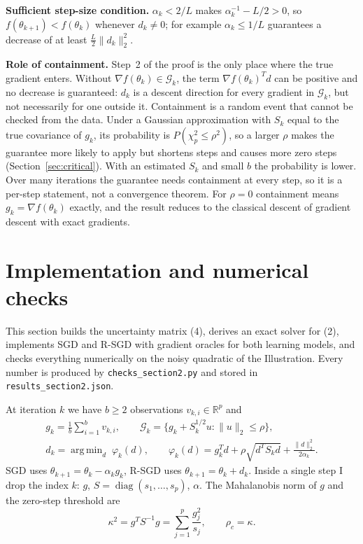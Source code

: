 \documentclass[11pt,a4paper]{article}
\newcommand{\G}{\mathcal{G}_k}
\newcommand{\norm}[1]{\lVert #1\rVert_2}
\DeclareMathOperator*{\argmin}{arg\,min}
\DeclareMathOperator{\diag}{diag}
\begin{document}
\textbf{Sufficient step-size condition.} $\alpha_k<2/L$ makes $\alpha_k^{-1}-L/2>0$, so
$f(\theta_{k+1})<f(\theta_k)$ whenever $d_k\ne0$; for example $\alpha_k\le1/L$ guarantees a decrease of
at least $\tfrac L2\norm{d_k}^2$.

\textbf{Role of containment.} Step~2 of the proof is the only place where the true gradient enters. Without
$\nabla f(\theta_k)\in\G$, the term $\nabla f(\theta_k)^Td$ can be positive and no decrease is
guaranteed: $d_k$ is a descent direction for every gradient in $\G$, but not necessarily for one
outside it. Containment is a random event that cannot be checked from the data. Under a Gaussian
approximation with $S_k$ equal to the true covariance of $g_k$, its probability is
$P(\chi^2_p\le\rho^2)$, so a larger $\rho$ makes the guarantee more likely to apply but shortens
steps and causes more zero steps (Section~\ref{sec:critical}). With an estimated $S_k$ and small
$b$ the probability is lower. Over many iterations the guarantee needs containment at every step,
so it is a per-step statement, not a convergence theorem. For $\rho=0$ containment means
$g_k=\nabla f(\theta_k)$ exactly, and the result reduces to the classical descent of gradient
descent with exact gradients.


\section{Implementation and numerical checks}\label{sec:impl}

This section builds the uncertainty matrix (4), derives an exact solver for (2), implements SGD and
R-SGD with gradient oracles for both learning models, and checks everything numerically on the noisy
quadratic of the Illustration. Every number is produced by \texttt{checks\_section2.py} and stored
in \texttt{results\_section2.json}.


At iteration $k$ we have $b\ge2$ observations $v_{k,i}\in\mathbb R^p$ and
\begin{gather*}
g_k=\frac1b\sum_{i=1}^b v_{k,i},\qquad
\G=\{g_k+S_k^{1/2}u:\norm{u}\le\rho\},\\
d_k=\argmin_d\;\varphi_k(d),\qquad
\varphi_k(d)=g_k^Td+\rho\sqrt{d^TS_kd}+\frac{\norm{d}^2}{2\alpha_k}.
\end{gather*}
SGD uses $\theta_{k+1}=\theta_k-\alpha_kg_k$, R-SGD uses $\theta_{k+1}=\theta_k+d_k$.
Inside a single step I drop the index $k$: $g$, $S=\diag(s_1,\dots,s_p)$, $\alpha$.
The Mahalanobis norm of $g$ and the zero-step threshold are
\begin{equation*}
\kappa^2=g^TS^{-1}g=\sum_{j=1}^p\frac{g_j^2}{s_j},\qquad \rho_c=\kappa .
\end{equation*}
\end{document}

